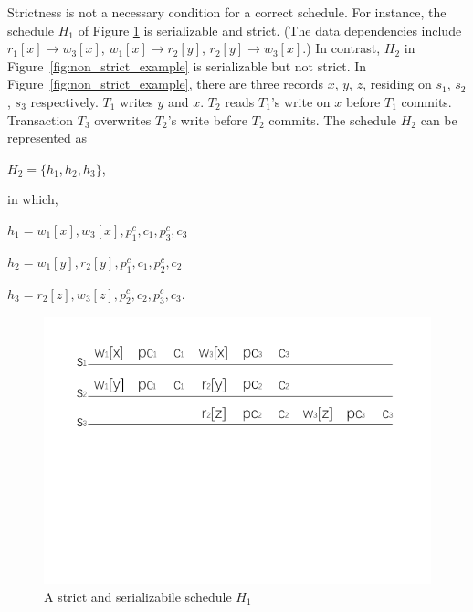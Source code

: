 \documentclass[conference]{IEEEtran}
\begin{document}
Strictness is not a necessary condition for a correct schedule.
For instance, the schedule ${H_1}$ of Figure \ref{fig:strict_example} is serializable and strict. %
(The data dependencies include ${r_1[x] \rightarrow w_3[x]}$, ${w_1[x] \rightarrow r_2[y]}$, ${r_2[y] \rightarrow w_3[x]}$.) 
In contrast, ${H_2}$ in Figure~\ref{fig:non_strict_example} is serializable but not strict.
In Figure~\ref{fig:non_strict_example}, there are three records ${x}$, ${y}$, ${z}$, residing on ${s_1}$, ${s_2}$, ${s_3}$ respectively.
${T_1}$ writes ${y}$ and ${x}$.
${T_2}$ reads ${T_1}$'s write on ${x}$ before ${T_1}$ commits.
Transaction ${T_3}$ overwrites ${T_2}$'s write before ${T_2}$ commits.
The schedule ${H_2}$ can be represented as
\begin{center}
  ${H_2 = \{h_1, h_2, h_3\}}$,
\end{center}
in which,
\begin{center}
${h_1=w_1[x], w_3[x], p^c_1, c_1, p^c_3, c_3}$

${h_2=w_1[y], r_2[y], p^c_1, c_1, p^c_2, c_2}$

${h_3=r_2[z], w_3[z], p^c_2, c_2, p^c_3, c_3 }$.
\end{center}




\begin{figure}[htbp]
  \centerline{\includegraphics[scale=1]{figure/schedule_strict.pdf}}
  \caption{A strict and serializabile schedule ${H_1}$}
  \label{fig:strict_example}
\end{figure}
\end{document}
